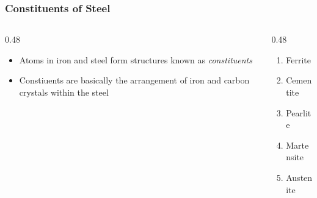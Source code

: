 \begin{frame}
	\frametitle{Constituents of Steel}

    \begin{columns}[t]
        \begin{column}{0.48\linewidth}
            \begin{itemize}[<+- | alert@+>]
                \item Atoms in iron and steel form structures known as \emph{constituents}
                \item Constiuents are basically the arrangement of iron and carbon crystals within the steel
            \end{itemize}
        \end{column}
        \begin{column}{0.48\linewidth}
            \begin{enumerate}[<+- | alert@+>]
                \item Ferrite
                \item Cementite
                \item Pearlite
                \item Martensite
                \item Austenite
            \end{enumerate}
        \end{column}
    \end{columns}
\end{frame}

